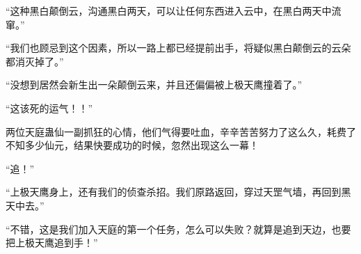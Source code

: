 \begin{this_body}
“这种黑白颠倒云，沟通黑白两天，可以让任何东西进入云中，在黑白两天中流窜。”

“我们也顾忌到这个因素，所以一路上都已经提前出手，将疑似黑白颠倒云的云朵都消灭掉了。”

“没想到居然会新生出一朵颠倒云来，并且还偏偏被上极天鹰撞着了。”

“这该死的运气！！”

两位天庭蛊仙一副抓狂的心情，他们气得要吐血，辛辛苦苦努力了这么久，耗费了不知多少仙元，结果快要成功的时候，忽然出现这么一幕！

“追！”

“上极天鹰身上，还有我们的侦查杀招。我们原路返回，穿过天罡气墙，再回到黑天中去。”

“不错，这是我们加入天庭的第一个任务，怎么可以失败？就算是追到天边，也要把上极天鹰追到手！”

\end{this_body}

